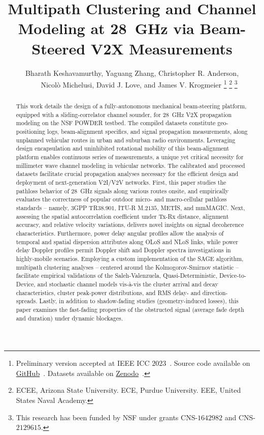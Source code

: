 \documentclass[12pt, draftcls, onecolumn]{IEEEtran}
\title{Multipath Clustering and Channel Modeling at \SI{28}{\giga\hertz} via Beam-Steered V2X Measurements}
\author{Bharath Keshavamurthy\IEEEauthorrefmark{1}, Yaguang Zhang\IEEEauthorrefmark{2}, Christopher R. Anderson\IEEEauthorrefmark{3},\\\ \ \ \ Nicol\`{o} Michelusi\IEEEauthorrefmark{1}, David J. Love\IEEEauthorrefmark{2}, and James V. Krogmeier\IEEEauthorrefmark{2}
\thanks{Preliminary version accepted at IEEE ICC $2023$~\cite{SPAVE_ICC}. Source code available on \href{https://github.com/bharathkeshavamurthy/SPAVE-28G}{GitHub}~\cite{SPAVE_Source_Code}. Datasets available on \href{https://doi.org/10.5281/zenodo.7178597}{Zenodo}~\cite{SPAVE_Dataset}.}
\thanks{\IEEEauthorrefmark{1}ECEE, Arizona State University. \IEEEauthorrefmark{2}ECE, Purdue University. \IEEEauthorrefmark{3}EEE, United States Naval Academy.}
\thanks{This research has been funded by NSF under grants CNS-$1642982$ and CNS-$2129615$.}
\vspace{-9mm}
}
\begin{document}

\maketitle
\thispagestyle{plain}
\pagestyle{plain}
\vspace{-9mm}

\begin{abstract}
This work details the design of a fully-autonomous mechanical beam-steering platform, equipped with a sliding-correlator channel sounder, for \SI{28}{\giga\hertz} V2X propagation modeling on the NSF POWDER testbed. The compiled datasets constitute geo-positioning logs, beam-alignment specifics, and signal propagation measurements, along unplanned vehicular routes in urban and suburban radio environments. Leveraging design encapsulation and uninhibited rotational mobility of this beam-alignment platform enables continuous series of measurements, a unique yet critical necessity for millimeter wave channel modeling in vehicular networks. The calibrated and processed datasets facilitate crucial propagation analyses necessary for the efficient design and deployment of next-generation V$2$I/V$2$V networks. First, this paper studies the pathloss behavior of \SI{28}{\giga\hertz} signals along various routes onsite, and empirically evaluates the correctness of popular outdoor micro- and macro-cellular pathloss standards -- namely, $3$GPP TR$38.901$, ITU-R M$.2135$, METIS, and mmMAGIC. Next, assessing the spatial autocorrelation coefficient under Tx-Rx distance, alignment accuracy, and relative velocity variations, delivers novel insights on signal decoherence characteristics. Furthermore, power delay angular profiles allow the analysis of temporal and spatial dispersion attributes along OLoS and NLoS links, while power delay Doppler profiles permit Doppler shift and Doppler spectra investigations in highly-mobile scenarios. Employing a custom implementation of the SAGE algorithm, multipath clustering analyses -- centered around the Kolmogorov-Smirnov statistic -- facilitate empirical validations of the Saleh-Valenzuela, Quasi-Deterministic, Device-to-Device, and stochastic channel models vis-\`{a}-vis the cluster arrival and decay characteristics, cluster peak-power distributions, and RMS delay- and direction-spreads. Lastly, in addition to shadow-fading studies (geometry-induced losses), this paper examines the fast-fading properties of the obstructed signal (average fade depth and duration) under dynamic blockages.
\end{abstract}
\vspace{-3mm}
\end{document}
